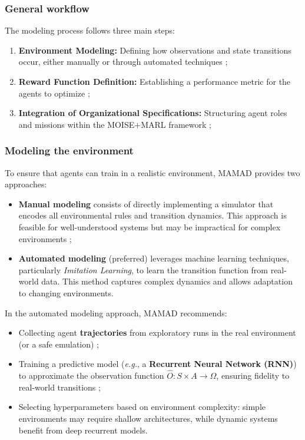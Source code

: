 \documentclass[pdflatex,sn-mathphys-num]{sn-jnl}%
\theoremstyle{thmstyleone}%
\theoremstyle{thmstyletwo}%
\theoremstyle{thmstylethree}%
\begin{document}
\subsubsection{{General workflow}}
The modeling process follows three main steps:
\begin{enumerate}
    \item \textbf{Environment Modeling:} Defining how observations and state transitions occur, either manually or through automated techniques ;
    \item \textbf{Reward Function Definition:} Establishing a performance metric for the agents to optimize ;
    \item \textbf{Integration of Organizational Specifications:} Structuring agent roles and missions within the MOISE+MARL framework ;
\end{enumerate}

\subsubsection{Modeling the environment}
To ensure that agents can train in a realistic environment, MAMAD provides two approaches:
\begin{itemize}
    \item \textbf{Manual modeling} consists of directly implementing a simulator that encodes all environmental rules and transition dynamics. This approach is feasible for well-understood systems but may be impractical for complex environments ;
    \item \textbf{Automated modeling} (preferred) leverages machine learning techniques, particularly \textit{Imitation Learning}, to learn the transition function from real-world data. This method captures complex dynamics and allows adaptation to changing environments.
\end{itemize}

In the automated modeling approach, MAMAD recommends:
\begin{itemize}
    \item Collecting agent \textbf{trajectories} from exploratory runs in the real environment (or a safe emulation) ;
    \item Training a predictive model (\textit{e.g.}, a \textbf{Recurrent Neural Network (RNN)}) to approximate the observation function $\hat{O}: S \times A \to \Omega$, ensuring fidelity to real-world transitions ;
    \item Selecting hyperparameters based on environment complexity: simple environments may require shallow architectures, while dynamic systems benefit from deep recurrent models.
\end{itemize}
\end{document}
